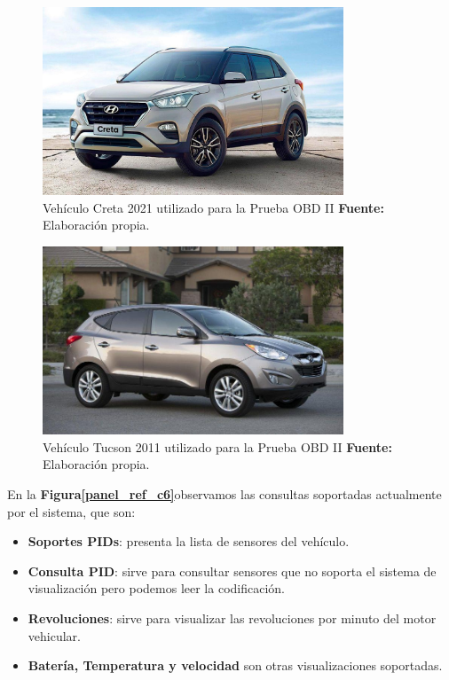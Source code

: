\begin{figure}[H]
	\centering
	\includegraphics[width=0.8\textwidth]{./Cap6imagen/creta_fig_c6.jpg}
	\caption [Vehículo Creta 2021 utilizado para la Prueba OBD II.]{Vehículo Creta 2021 utilizado para la Prueba OBD II \textbf{ Fuente:} %
		Elaboración propia.}
	\label{creta_ref_c6} %
\end{figure}

\begin{figure}[H]
	\centering
	\includegraphics[width=0.8\textwidth]{./Cap6imagen/tucson_fig_c6.jpg}
	\caption [Vehículo Tucson 2011 utilizado para la Prueba OBD II.]{Vehículo Tucson 2011 utilizado para la Prueba OBD II \textbf{ Fuente:} %
		Elaboración propia.}
	\label{tucson_ref_c6} %
\end{figure}

En la \textbf{Figura\ref{panel_ref_c6}}observamos las consultas soportadas actualmente por el sistema, que son:
\begin{itemize}
    \item \textbf{Soportes PIDs}: presenta la lista de sensores del vehículo. 
    \item \textbf{Consulta PID}: sirve para consultar sensores que no soporta el sistema de visualización pero podemos leer la codificación. 
    \item \textbf{Revoluciones}: sirve para visualizar las revoluciones por minuto del motor vehicular.
    \item \textbf{Batería, Temperatura y velocidad} son otras visualizaciones soportadas.     
\end{itemize}




